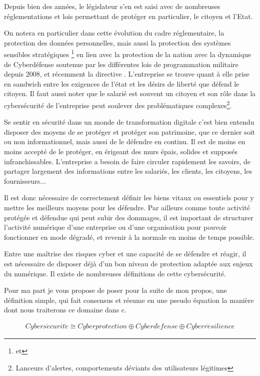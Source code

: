 Depuis bien des années, le législateur s'en est saisi avec de nombreuses réglementations et lois permettant de protéger en particulier, le citoyen et l'Etat.

On notera en particulier dans cette évolution du cadre réglementaire,  la protection des données personnelles, mais aussi la protection des systèmes sensibles stratégiques \footnote{  et  } en lien avec la protection de la nation avec la dynamique de Cyberdéfense soutenue par les différentes lois de programmation militaire depuis 2008, et récemment la directive  . L'entreprise se trouve quant à elle prise en sandwich entre les exigences de l'état et les désirs de liberté que défend le citoyen. Il faut aussi noter que le salarié est souvent un citoyen et son rôle dans la cybersécurité de l'entreprise peut soulever des problématiques complexes\footnote{Lanceurs d'alertes, comportements déviants des utilisateurs légitimes}.
 
Se sentir en sécurité dans un monde de transformation digitale c'est bien entendu disposer des moyens de se protéger et protéger son patrimoine, que ce dernier soit ou non informationnel, mais aussi de le défendre en continu. Il est de moins en moins accepté de le protéger, en érigeant des murs épais, solides et supposés infranchissables. L'entreprise a besoin de faire circuler rapidement les savoirs, de partager largement des informations entre les salariés, les clients, les citoyens, les fournisseurs...


Il est donc nécessaire de correctement définir les biens vitaux ou essentiels pour y mettre les meilleurs moyens pour les défendre. Par ailleurs comme toute activité protégée et défendue qui peut subir des dommages, il est important de structurer l'activité numérique d'une entreprise ou d'une organisation pour pouvoir fonctionner en mode dégradé, et revenir à la normale en moins de temps possible.


Entre une maîtrise des risques cyber et une capacité de se défendre et réagir, il est nécessaire de disposer déjà d'un bon niveau de protection adaptée aux enjeux du numérique. Il existe de nombreuses définitions de cette cybersécurité.

Pour ma part je vous propose de poser pour la suite de mon propos, une définition simple, qui fait consensus et résume en une pseudo équation la manière dont nous traiterons ce domaine dans c\ecours. \\
\begin{nota}
\begin{align}
Cybers\acute{e}curit\acute{e} \cong Cyberprotection\oplus Cyberd\acute{e}fense \oplus Cyberr\acute{e}silience
\end{align}
\end{nota}


